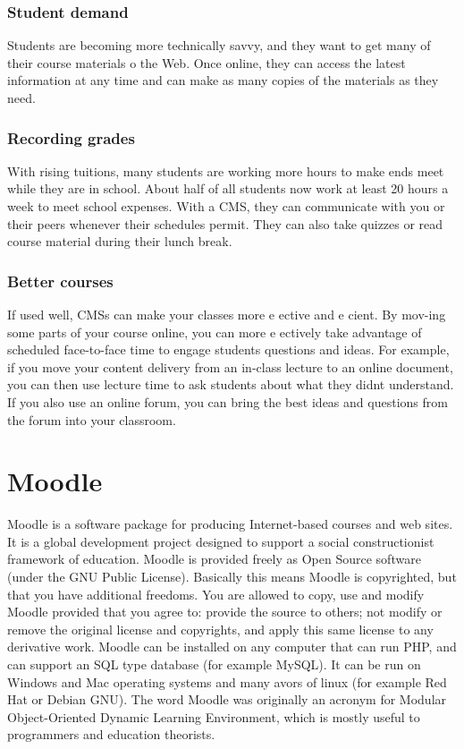 \documentclass[12pt,a4paper,final,oneside]{report}
\begin{document}
\subsection{Student demand}
Students are becoming more technically savvy, and they want to get many of their course materials o the Web. Once online, they can access the latest information at any time and can make as many copies of the materials as they need.

\subsection{Recording grades}
With rising tuitions, many students are working more hours to make ends meet while they are in school. About half of all students now work at least 20 hours a week to meet school expenses. With a CMS, they can communicate with you or their peers whenever their schedules permit. They can also take quizzes or read course material during their lunch break.

\subsection{Better courses}
If used well, CMSs can make your classes more e ective and e cient. By mov-ing some parts of your course online, you can more e ectively take advantage of scheduled face-to-face time to engage students questions and ideas. For example, if you move your content delivery from an in-class lecture to an online document, you can then use lecture time to ask students about what they didnt understand. If you also use an online forum, you can bring the best ideas and questions from the forum into your classroom.


\chapter{Moodle}

Moodle is a software package for producing Internet-based courses and web sites. It is a global development project designed to support a social constructionist framework of education. Moodle is provided freely as Open Source software (under the GNU Public License). Basically this means Moodle is copyrighted, but that you have additional freedoms. You are allowed to copy, use and modify Moodle provided that you agree to: provide the source to others; not modify or remove the original license and copyrights, and apply this same license to any derivative work. Moodle can be installed on any computer that can run PHP, and can support an SQL type database (for example MySQL). It can be run on Windows and Mac operating systems and many avors of linux (for example Red Hat or Debian GNU). The word Moodle was originally an acronym for Modular Object-Oriented Dynamic Learning Environment, which is mostly useful to programmers and education theorists.
\end{document}
